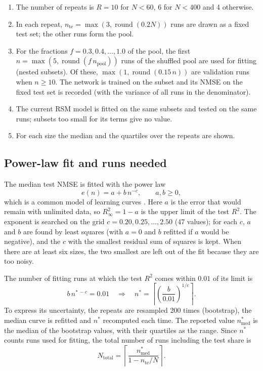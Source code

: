 \begin{enumerate}
  \item The number of repeats is $R = 10$ for $N < 60$, 6 for $N < 400$ and 4 otherwise.
  \item In each repeat, $n_\text{te} = \max(3, \operatorname{round}(0.2N))$ runs are drawn as a fixed test set; the
    other runs form the pool.
  \item For the fractions $f = 0.3, 0.4, \dots, 1.0$ of the pool, the first $n = \max(5, \operatorname{round}(f\,
    n_\text{pool}))$ runs of the shuffled pool are used for fitting (nested subsets). Of these, $\max(1,
    \operatorname{round}(0.15\,n))$ are validation runs when $n \ge 10$. The network is trained on the subset and
    its NMSE on the fixed test set is recorded (with the variance of all runs in the denominator).
  \item The current RSM model is fitted on the same subsets and tested on the same runs; subsets too small for its
    terms give no value.
  \item For each size the median and the quartiles over the repeats are shown.
\end{enumerate}

\subsection{Power-law fit and runs needed}

The median test NMSE is fitted with the power law
\begin{equation}
  e(n) = a + b\,n^{-c}, \qquad a, b \ge 0, \label{eq:ch07-powerlaw}
\end{equation}
which is a common model of learning curves \citep{figueroa2012}. Here $a$ is the error that would remain with
unlimited data, so $R^2_\infty = 1 - a$ is the upper limit of the test $R^2$. The exponent is searched on the grid
$c = 0.20, 0.25, \dots, 2.50$ (47 values); for each $c$, $a$ and $b$ are found by least squares (with $a = 0$ and
$b$ refitted if $a$ would be negative), and the $c$ with the smallest residual sum of squares is kept. When there
are at least six sizes, the two smallest are left out of the fit because they are too noisy.

The number of fitting runs at which the test $R^2$ comes within $0.01$ of its limit is
\begin{equation}
  b\,n^{*\,-c} = 0.01 \quad\Longrightarrow\quad n^* = \left\lceil \left(\frac{b}{0.01}\right)^{1/c}\right\rceil.
  \label{eq:ch07-nstar}
\end{equation}
To express its uncertainty, the repeats are resampled 200 times (bootstrap), the median curve is refitted and
$n^*$ recomputed each time. The reported value $n^*_\text{med}$ is the median of the bootstrap values, with their
quartiles as the range. Since $n^*$ counts runs used for fitting, the total number of runs including the test
share is
\begin{equation}
  N_\text{total} = \left\lceil \frac{n^*_\text{med}}{1 - n_\text{te}/N} \right\rceil. \label{eq:ch07-ntotal}
\end{equation}

